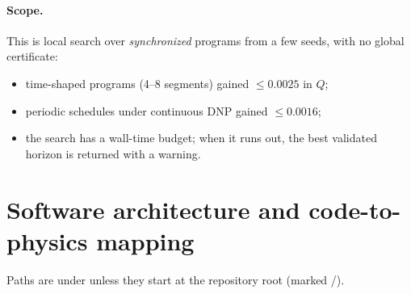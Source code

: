 \documentclass[11pt]{article}
\begin{document}
\paragraph{Scope.} This is local search over \emph{synchronized} programs from a few seeds, with
no global certificate:
\begin{itemize}
\item time-shaped programs (4--8 segments) gained \(\le0.0025\) in \(Q\);
\item periodic schedules under continuous DNP gained \(\le0.0016\);
\item the search has a wall-time budget; when it runs out, the best validated horizon is returned
with a warning.
\end{itemize}

\section{Software architecture and code-to-physics mapping}
\label{sec:architecture}

Paths are under \texttt{} unless they start at the repository root (marked /).
\end{document}
